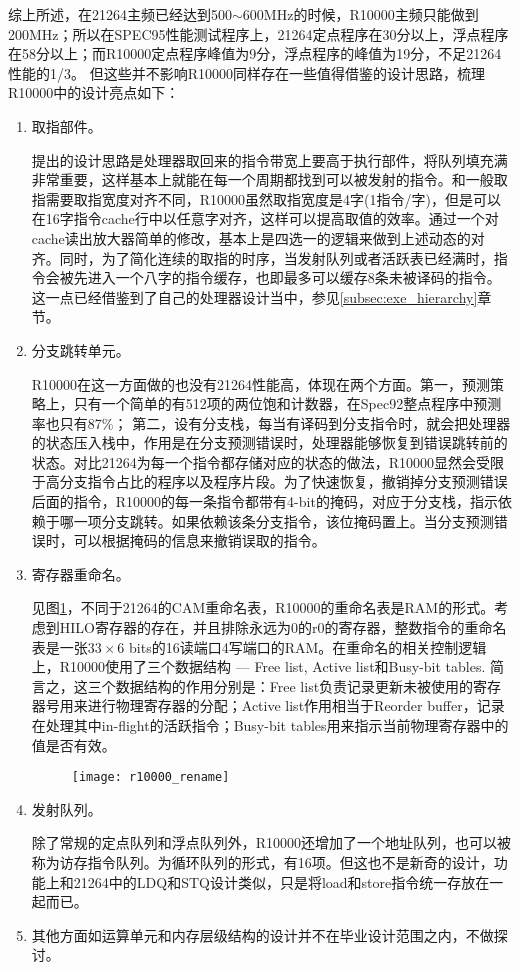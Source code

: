 综上所述，在21264主频已经达到500$ \sim $600MHz的时候，R10000主频只能做到200MHz；所以在SPEC95性能测试程序上，21264定点程序在30分以上，浮点程序在58分以上；而R10000定点程序峰值为9分，浮点程序的峰值为19分，不足21264性能的1/3\citep{Alpha21264,MIPS1996}。 但这些并不影响R10000同样存在一些值得借鉴的设计思路，梳理R10000中的设计亮点如下：
\begin{enumerate}[label=(\alph*)]
	\item 取指部件。
	
	\citet{MIPS1996}提出的设计思路是处理器取回来的指令带宽上要高于执行部件，将队列填充满非常重要，这样基本上就能在每一个周期都找到可以被发射的指令。和一般取指需要取指宽度对齐不同，R10000虽然取指宽度是4字(1指令/字)，但是可以在16字指令cache行中以任意字对齐，这样可以提高取值的效率。通过一个对cache读出放大器简单的修改，基本上是四选一的逻辑来做到上述动态的对齐。同时，为了简化连续的取指的时序，当发射队列或者活跃表已经满时，指令会被先进入一个八字的指令缓存\citep{MIPS1996}，也即最多可以缓存8条未被译码的指令。这一点已经借鉴到了自己的处理器设计当中，参见\ref{subsec:exe_hierarchy}章节。
	\item 分支跳转单元。
	
	R10000在这一方面做的也没有21264性能高，体现在两个方面。第一，预测策略上，只有一个简单的有512项的两位饱和计数器，在Spec92整点程序中预测率也只有87\%\citep{MIPS1996}； 第二，设有分支栈，每当有译码到分支指令时，就会把处理器的状态压入栈中，作用是在分支预测错误时，处理器能够恢复到错误跳转前的状态。对比21264为每一个指令都存储对应的状态的做法，R10000显然会受限于高分支指令占比的程序以及程序片段。为了快速恢复，撤销掉分支预测错误后面的指令，R10000的每一条指令都带有4-bit的掩码，对应于分支栈，指示依赖于哪一项分支跳转。如果依赖该条分支指令，该位掩码置上。当分支预测错误时，可以根据掩码的信息来撤销误取的指令。
	\item 寄存器重命名。
	
	见图\ref{fig:r10000_rename}，不同于21264的CAM重命名表，R10000的重命名表是RAM的形式。考虑到HILO寄存器的存在，并且排除永远为$ 0 $的r0的寄存器，整数指令的重命名表是一张$ 33\times 6 $ bits的16读端口4写端口的RAM\citep{MIPS1996}。在重命名的相关控制逻辑上，R10000使用了三个数据结构 --- Free list, Active list和Busy-bit tables. 简言之，这三个数据结构的作用分别是：Free list负责记录更新未被使用的寄存器号用来进行物理寄存器的分配；Active list作用相当于Reorder buffer，记录在处理其中in-flight的活跃指令；Busy-bit tables用来指示当前物理寄存器中的值是否有效。
	\begin{figure}[!htbp]
		\centering
		\texttt{[image: r10000\_rename]}
		\label{fig:r10000_rename}
	\end{figure}
	
	\item 发射队列。
	
	除了常规的定点队列和浮点队列外，R10000还增加了一个地址队列，也可以被称为访存指令队列。为循环队列的形式，有16项。但这也不是新奇的设计，功能上和21264中的LDQ和STQ设计类似，只是将load和store指令统一存放在一起而已。
	\item 其他方面如运算单元和内存层级结构的设计并不在毕业设计范围之内，不做探讨。
\end{enumerate}

